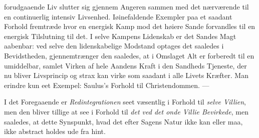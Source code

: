 forudgaaende Liv slutter sig gjennem Angeren sammen med det nærværende til en
continuerlig intensiv Livsenhed. Iøinefaldende Exempler paa et saadant Forhold
fremtræde hvor en energisk Kamp mod det høiere Sande forvandles til en energisk
Tilslutning til det. I selve Kampens Lidenskab er det Sandes Magt aabenbar: ved
selve den lidenskabelige Modstand optages det saaledes i Bevidstheden,
gjennemtrænger
 den saaledes, at i Omslaget Alt er forberedt til en umiddelbar, samlet Virken af
hele Aandens Kraft i den Sandheds Tjeneste, der nu bliver Livsprincip og strax
kan virke som saadant i alle Livets Kræfter. Man erindre kun eet Exempel:
Saulus's Forhold til Christendommen. ---

I det Foregaaende er \emph{Redintegrationen} seet væsentlig i Forhold til
\emph{selve Villien}, men den bliver tillige at see i Forhold til \emph{det ved
det onde Villie Bevirkede}, men saaledes, at dette Synspunkt, hvad det efter
Sagens Natur ikke kan eller maa, ikke abstract holdes ude fra hint.

